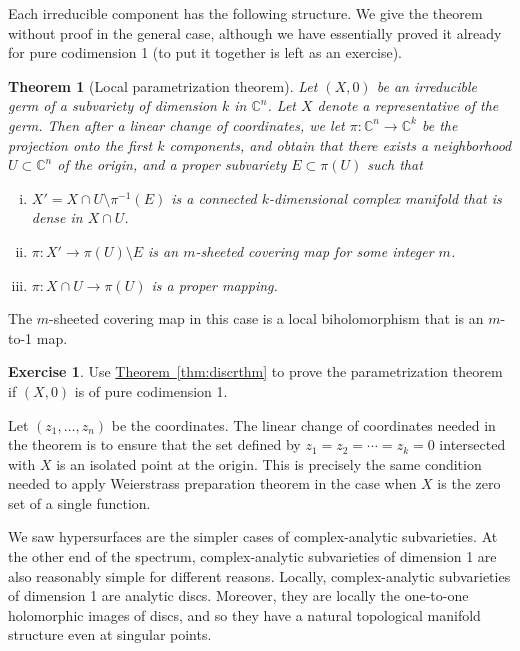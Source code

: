 \documentclass[12pt,openany]{book}
\newcommand{\C}{{\mathbb{C}}}
\newcommand{\myindex}[1]{#1\index{#1}}
\theoremstyle{plain}
\newtheorem{thm}{Theorem}[section]
\theoremstyle{remark}
\theoremstyle{definition}
\newenvironment{exbox}{%
    \def\FrameCommand{\vrule width 1pt \relax\hspace{10pt}}%
    \MakeFramed{\advance\hsize-\width\FrameRestore}%
}{%
    \endMakeFramed
}
\theoremstyle{exercise}
\newtheorem{exercise}{Exercise}[section]
\theoremstyle{example}
\newcommand{\thmref}[1]{\hyperref[#1]{Theorem~\ref*{#1}}}
\begin{document}
Each irreducible component has the following structure.
We give the theorem without proof in the general case, although we have
essentially proved it already for pure codimension 1 (to put it
together is left as an exercise).

\begin{thm}[\myindex{Local parametrization theorem}]
\pagebreak[2]
\label{localparthm}
Let $(X,0)$ be an irreducible germ of a subvariety of dimension $k$
in $\C^n$.  Let $X$ denote a representative of the germ.
Then after a linear change of coordinates, we let
$\pi \colon \C^n \to \C^k$ be the projection onto the first $k$
components, and obtain that there exists a neighborhood $U \subset \C^n$
of the origin, and a proper subvariety $E \subset \pi(U)$ such that
\begin{enumerate}[(i)]
\item $X' = X \cap U \setminus \pi^{-1}(E)$ is a connected
$k$-dimensional complex manifold that is dense in $X \cap U$.
\item $\pi \colon X' \to \pi(U) \setminus E$ is an $m$-sheeted covering map
for some integer $m$.
\item $\pi \colon X \cap U \to \pi(U)$ is a proper mapping.
\end{enumerate}
\end{thm}

\pagebreak[2]
The $m$-sheeted covering map in this case is a local biholomorphism
that is an $m$-to-1 map.

\begin{exbox}
\begin{exercise}
Use \thmref{thm:discrthm}
to prove the parametrization theorem if $(X,0)$ is
of pure codimension 1.
\end{exercise}
\end{exbox}

Let $(z_1,\ldots,z_n)$ be the coordinates.
The linear change of coordinates needed in the theorem is
to ensure that the set defined by $z_1=z_2=\cdots=z_k = 0$ intersected
with $X$ is an isolated point at the origin.  This is precisely
the same condition needed to apply Weierstrass preparation theorem in the case
when $X$ is the zero set of a single function.

\medskip

We saw hypersurfaces are the simpler cases of complex-analytic
subvarieties.  At the other end of the spectrum, complex-analytic
subvarieties of dimension 1 are also reasonably simple for different reasons.
Locally, complex-analytic subvarieties of dimension 1 are analytic discs.
Moreover, they are locally the one-to-one holomorphic images of discs,
and so they have a natural topological manifold structure even at singular
points.
\end{document}
